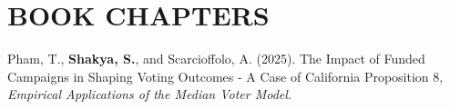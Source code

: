 \section*{BOOK CHAPTERS}
\begin{etaremune}
\item Pham, T., \textbf{Shakya, S.}, and Scarcioffolo, A. (2025). The Impact of Funded Campaigns in Shaping Voting Outcomes - A Case of California Proposition 8, \textit{Empirical Applications of the Median Voter Model}.


\end{etaremune}


